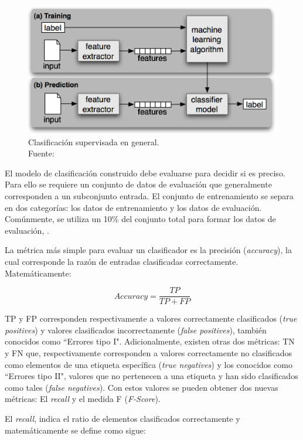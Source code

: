 \begin{figure}[H]
	\centering
	\captionsetup{justification=centering}
	\includegraphics[scale=0.8]{images/TrainingPrediction.png}
	\caption[Clasificación supervisada en general.]{Clasificación supervisada en general.\\Fuente: \citep{NPLK}}
	\label{fig:NPLK}
\end{figure}

El modelo de clasificación construido debe evaluarse para decidir si es preciso. Para ello se requiere un conjunto de datos de evaluación que generalmente corresponden a un subconjunto entrada. El conjunto de entrenamiento se separa en dos categorías: los datos de entrenamiento y los datos de evaluación. Comúnmente, se utiliza un 10\% del conjunto total para formar los datos de evaluación, \citep{NPLK}.

La métrica más simple para evaluar un clasificador es la precisión (\textit{accuracy}), la cual corresponde la razón de entradas clasificadas correctamente. Matemáticamente:

\[
	Accuracy = \frac{TP}{TP+FP}
\]

TP y FP corresponden respectivamente a valores correctamente clasificados (\textit{true positives}) y valores clasificados incorrectamente (\textit{false positives}), también conocidos como ``Errores tipo I". Adicionalmente, existen otras dos métricas: TN y FN que, respectivamente corresponden a valores correctamente no clasificados como elementos de una etiqueta específica (\textit{true negatives}) y los conocidos como ``Errores tipo II", valores que no pertenecen a una etiqueta y han sido clasificados como tales (\textit{false negatives}). Con estos valores se pueden obtener dos nuevas métricas: El \textit{recall} y el medida F (\textit{F-Score}).

El \textit{recall}, indica el ratio de elementos clasificados correctamente y matemáticamente se define como sigue:

